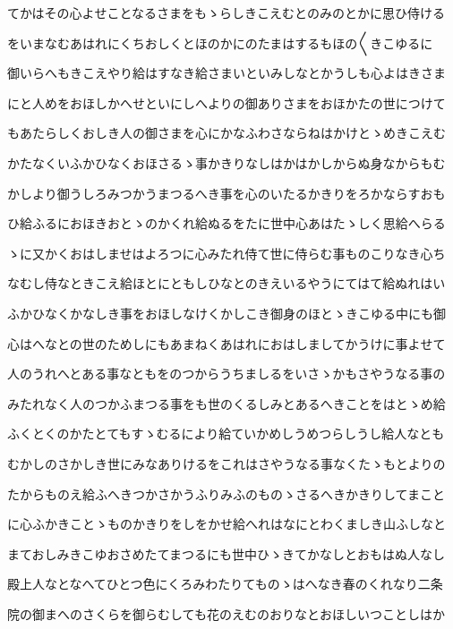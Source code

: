 \documentclass[a4paper,11pt,landscape]{ltjtarticle}
\begin{document}
てかはその心よせことなるさまをもゝらしきこえむとのみのとかに思ひ侍ける
\par\medskip
をいまなむあはれにくちおしくとほのかにのたまはするもほの〱きこゆるに
\par\medskip
御いらへもきこえやり給はすなき給さまいといみしなとかうしも心よはきさま
\par\medskip
にと人めをおほしかへせといにしへよりの御ありさまをおほかたの世につけて
\par\medskip
もあたらしくおしき人の御さまを心にかなふわさならねはかけとゝめきこえむ
\par\medskip
かたなくいふかひなくおほさるゝ事かきりなしはかはかしからぬ身なからもむ
\par\medskip
かしより御うしろみつかうまつるへき事を心のいたるかきりをろかならすおも
\par\medskip
ひ給ふるにおほきおとゝのかくれ給ぬるをたに世中心あはたゝしく思給へらる
\par\medskip
ゝに又かくおはしませはよろつに心みたれ侍て世に侍らむ事ものこりなき心ち
\par\medskip
なむし侍なときこえ給ほとにともしひなとのきえいるやうにてはて給ぬれはい
\par\medskip
ふかひなくかなしき事をおほしなけくかしこき御身のほとゝきこゆる中にも御
\par\medskip
心はへなとの世のためしにもあまねくあはれにおはしましてかうけに事よせて
\par\medskip
人のうれへとある事なともをのつからうちましるをいさゝかもさやうなる事の
\par\medskip
みたれなく人のつかふまつる事をも世のくるしみとあるへきことをはとゝめ給
\par\medskip
ふくとくのかたとてもすゝむるにより給ていかめしうめつらしうし給人なとも
\par\medskip
むかしのさかしき世にみなありけるをこれはさやうなる事なくたゝもとよりの
\par\medskip
たからものえ給ふへきつかさかうふりみふのものゝさるへきかきりしてまこと
\par\medskip
に心ふかきことゝものかきりをしをかせ給へれはなにとわくましき山ふしなと
\par\medskip
まておしみきこゆおさめたてまつるにも世中ひゝきてかなしとおもはぬ人なし
\par\medskip
殿上人なとなへてひとつ色にくろみわたりてものゝはへなき春のくれなり二条
\par\medskip
院の御まへのさくらを御らむしても花のえむのおりなとおほしいつことしはか
\par\medskip
\end{document}
